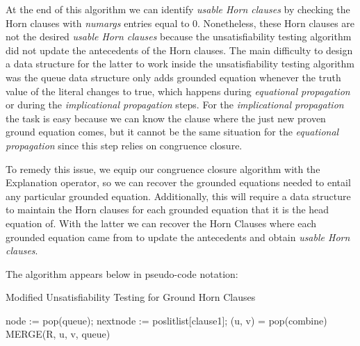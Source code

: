 At the end of this algorithm we can identify 
\emph{usable Horn clauses} by checking the Horn clauses
with \emph{numargs} entries equal to 0. Nonetheless, these 
Horn clauses are not the
desired \emph{usable Horn clauses} because the 
unsatisfiability testing algorithm
did not update the antecedents of the Horn clauses. 
The main difficulty to design a data structure
for the latter to work inside the unsatisfiability 
testing algorithm was the queue data structure
only adds grounded equation whenever the truth 
value of the literal changes to true, which happens
during \emph{equational propagation} or during 
the \emph{implicational propagation} steps.
For the \emph{implicational propagation} the task is 
easy because we can know the clause
where the just new proven ground equation comes, 
but it cannot be the same situation
for the \emph{equational propagation} since this 
step relies on congruence closure.

To remedy this issue, we equip our congruence closure 
algorithm with the Explanation operator, so
we can recover the grounded equations needed to entail 
any particular grounded equation. Additionally,
this will require a data structure to maintain the Horn 
clauses for each grounded equation that
it is the head equation of. With the latter we can 
recover the Horn Clauses where each grounded
equation came from to update the antecedents and 
obtain \emph{usable Horn clauses}.

The algorithm appears below in pseudo-code notation:

\begin{algorithm}[!ht]
  \caption{Modified Unsatisfiability Testing for Ground Horn Clauses}
  \linespread{\separationline}\selectfont
  \begin{algorithmic}[1]
    \State node := pop(queue);
    \EndIf
    \State nextnode := poslitlist[clause1];
    \EndIf
    \Else
    \EndIf
    \EndIf
    \EndIf
    \EndFor
    \EndIf
    \EndWhile
    \EndProcedure
    \Statex
    \State (u, v) = pop(combine)
    \State MERGE(R, u, v, queue)
    \EndWhile
    \EndProcedure
  \end{algorithmic}
\end{algorithm}

